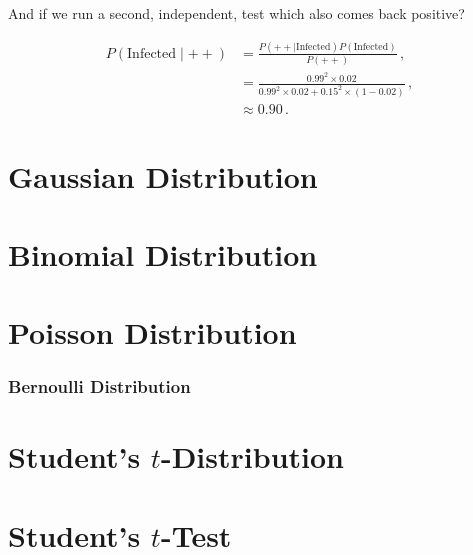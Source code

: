 \noindent And if we run a second, independent, test which also comes back positive?

\begin{equation}\label{eq:stats:BayesEx2}
\begin{split}
P\left(\text{Infected} \mid ++\right) &= \frac{P\left(++ \mid \text{Infected}\right) P\left(\text{Infected}\right)}{P\left(++\right)}\,, \\
&= \frac{\num{0.99}^{2} \times \num{0.02}}{\num{0.99}^{2} \times \num{0.02} + \num{0.15}^{2} \times \left(1-\num{0.02}\right)}\,, \\
&\approx \num{0.90}\,.
\end{split}
\end{equation}

\section{Gaussian Distribution}
\label{stats:gaus}

\section{Binomial Distribution}
\label{stats:binomial}

\section{Poisson Distribution}
\label{stats:poisson}

\subsubsection{Bernoulli Distribution}
\label{stats:poisson:bernoulli}

\section{Student's \texorpdfstring{$t$}{t}-Distribution}
\label{stats:t_dist}

\section{Student's \texorpdfstring{$t$}{t}-Test}
\label{stats:t_test}

